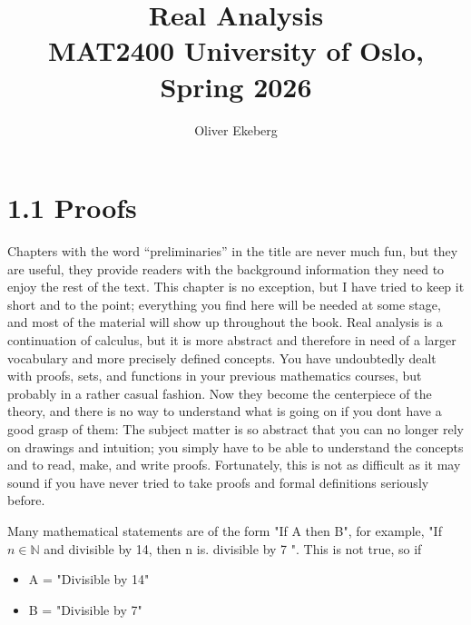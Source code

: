 \documentclass[a4paper,norsk]{article}
\title{Real Analysis \\ MAT2400 University of Oslo, Spring 2026}
\author{Oliver Ekeberg}
\begin{document}
\tableofcontents


\section*{1.1 Proofs}

Chapters with the word “preliminaries” in the title are never much fun, but they are useful, they provide readers with the background information they need to enjoy the rest of the text. This chapter is no exception, but I have tried to keep it short and to the point; everything you find here will be needed at some stage, and most of the material will show up throughout the book.
Real analysis is a continuation of calculus, but it is more abstract and therefore in need of a larger vocabulary and more precisely defined concepts. You have undoubtedly dealt with proofs, sets, and functions in your previous mathematics courses, but probably in a rather casual fashion. Now they become the centerpiece of the theory, and there is no way to understand what is going on if you dont have a good grasp of them: The subject matter is so abstract that you can no longer rely on drawings and intuition; you simply have to be able to understand the concepts and to read, make, and write proofs. Fortunately, this is not as difficult as it may sound if you have never tried to take proofs and formal definitions seriously before.

Many mathematical statements are of the form "If A then B", for example, "If $ n \in \mathbb{N}$ and divisible by 14, then n is. divisible by 7  ". This is not true, so if 

\begin{itemize}
    \item A = "Divisible by 14"
    \item B = "Divisible by 7"
\end{itemize}
\end{document}
